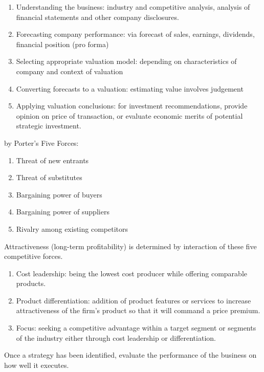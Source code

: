 \begin{method} 
\begin{enumerate}[label=\arabic*.]
\setlength{\itemsep}{0pt}
\item Understanding the business: industry and competitive analysis, analysis of financial statements and other company disclosures.
\item Forecasting company performance: via forecast of sales, earnings, dividends, financial position (pro forma)
\item Selecting appropriate valuation model: depending on characteristics of company and context of valuation
\item Converting forecasts to a valuation: estimating value involves judgement
\item Applying valuation conclusions: for investment recommendations, provide opinion on price of transaction, or evaluate economic merits of potential strategic investment.
\end{enumerate}
\end{method}

\begin{remark}  by Porter's Five Forces:
\begin{enumerate}[label=\arabic*.]
\setlength{\itemsep}{0pt}
\item Threat of new entrants
\item Threat of substitutes
\item Bargaining power of buyers
\item Bargaining power of suppliers
\item Rivalry among existing competitors
\end{enumerate}
Attractiveness (long-term profitability) is determined by interaction of these five competitive forces.
\end{remark}

\begin{remark} 
\begin{enumerate}[label=\roman*.]
\setlength{\itemsep}{0pt}
\item Cost leadership: being the lowest cost producer while offering comparable products.
\item Product differentiation: addition of product features or services to increase attractiveness of the firm's product so that it will command a price premium.
\item Focus: seeking a competitive advantage within a target segment or segments of the industry either through cost leadership or differentiation.
\end{enumerate}
Once a strategy has been identified, evaluate the performance of the business on how well it executes.
\end{remark}

